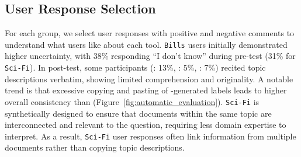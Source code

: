 \subsection{User Response Selection}
For each group, we select user responses with positive and negative comments to understand what users like about each tool.
%
\texttt{Bills} users initially demonstrated higher uncertainty, with 38\% responding ``I don't know'' during pre-test (31\% for \texttt{Sci-Fi}). 
%
In post-test, some participants (\topicgpt{}: 13\%, \lloom{}: 5\%, \bass{}: 7\%) %
recited topic descriptions verbatim, showing limited comprehension and originality.
%
A notable trend is that excessive copying and pasting of \mm{}-generated labels leads to higher overall consistency than  (Figure~\ref{fig:automatic_evaluation}).
%
\texttt{Sci-Fi} is synthetically designed to ensure that documents within the same topic are interconnected and relevant to the question, requiring less domain expertise to interpret. 
%
As a result, \texttt{Sci-Fi} user responses often link information from multiple documents rather than copying \mm{} topic descriptions.



